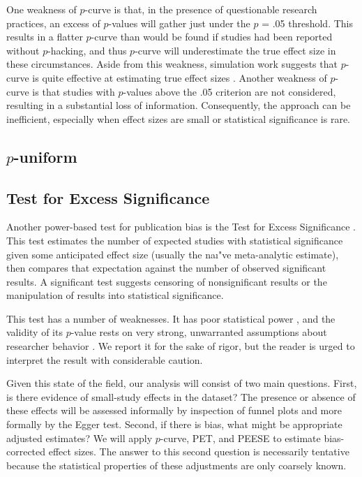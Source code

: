 \documentclass[man, mask]{apa6}
\begin{document}
One weakness of $p$-curve is that, in the presence of questionable research practices, an excess of $p$-values will gather just under the $p$ = .05 threshold. This results in a flatter $p$-curve than would be found if studies had been reported without $p$-hacking, and thus $p$-curve will underestimate the true effect size in these circumstances. Aside from this weakness, simulation work suggests that $p$-curve is quite effective at estimating true effect sizes \citep{Simonsohn:etal:2014,Simonsohn:etal:2014b}.  Another weakness of $p$-curve is that studies with $p$-values above the .05 criterion are not considered, resulting in a substantial loss of information.  Consequently, the approach can be inefficient, especially when effect sizes are small or statistical significance is rare.


\subsection{$p$-uniform}



\subsection{Test for Excess Significance}
Another power-based test for publication bias is the Test for Excess Significance \citep{Ioannidis:Trikalinos:2007}. This test estimates the number of expected studies with statistical significance given some anticipated effect size (usually the na{\i"}ve meta-analytic estimate), then compares that expectation against the number of observed significant results. A significant test suggests censoring of nonsignificant results or the manipulation of results into statistical significance.

This test has a number of weaknesses. It has poor statistical power \citep{Ioannidis:Trikalinos:2007}, and the validity of its $p$-value rests on very strong, unwarranted assumptions about researcher behavior \citep{Morey:2013}. We report it for the sake of rigor, but the reader is urged to interpret the result with considerable caution.

Given this state of the field, our analysis will consist of two main questions.  First, is there evidence of small-study effects in the dataset?  The presence or absence of these effects will be assessed informally by inspection of funnel plots and more formally by the Egger test.  Second, if there is bias, what might be appropriate adjusted estimates?  We will apply  $p$-curve, PET, and PEESE to estimate bias-corrected effect sizes.  The answer to this second question is necessarily tentative because the statistical properties of these adjustments are only coarsely known.
\end{document}
